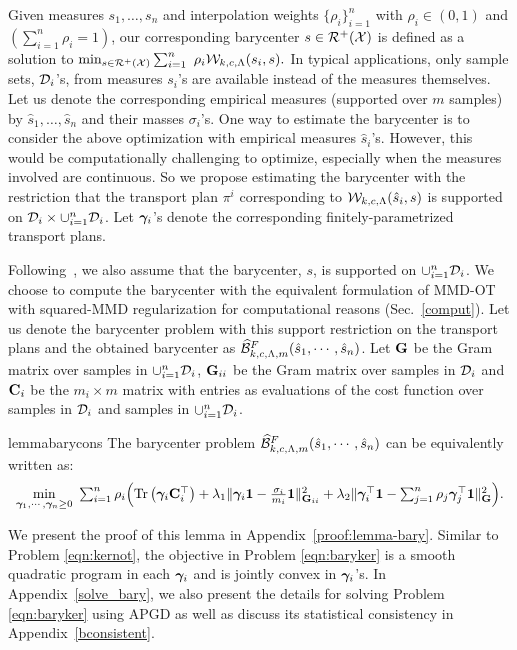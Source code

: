 Given measures $s_1,\ldots,s_n$ and interpolation weights $\{\rho_i\}_{i=1}^n$ with $\rho_i\in (0, 1)$ and $(\sum_{i=1}^n \rho_i = 1)$, our corresponding barycenter $s\in\mathcal{R}^+(\mathcal{X})$ is defined as a solution to $\min_{s\in\calR^+(\calX)}\sum_{i=1}^n\ \rho_i \calU(s_i,s).$
In typical applications, only sample sets, $\mathcal{D}_i$'s, from measures $s_i$'s are available instead of the measures themselves. Let us denote the corresponding empirical measures (supported over $m$ samples) by $\hat{s}_1,\ldots,\hat{s}_n$ and their masses $\sigma_i$'s. One way to estimate the barycenter is to consider the above optimization with empirical measures $\hat{s}_i$'s. However, this would be computationally challenging to optimize, especially when the measures involved are continuous. So we propose estimating the barycenter with the restriction that the transport plan $\pi^i$ corresponding to $\mathcal{W}_{k, c, \Lambda}(\hat{s}_i, s)$ is supported on $\mathcal{D}_i\times \cup_{i=1}^n\mathcal{D}_i$. Let $\bm{\gamma}_i$'s denote the corresponding finitely-parametrized transport plans. 

Following~\cite{10.5555/3044805.3044969}, we also assume that the barycenter, $s$, is supported on $\cup_{i=1}^n\mathcal{D}_i$. We choose to compute the barycenter with the equivalent formulation of MMD-OT with squared-MMD regularization for computational reasons (Sec.~\ref{comput}). Let us denote the barycenter problem with this support restriction on the transport plans and the obtained barycenter as $\widehat{\mathcal{B}}^F_{k,c,\Lambda, m}(\hat{s}_1, \cdots, \hat{s}_n)$.
Let $\mathbf{G}$ be the Gram matrix over samples in $\cup_{i=1}^n\mathcal{D}_i$, $\mathbf{G}_{ii}$ be the Gram matrix over samples in $\mathcal{D}_i$ and $\mathbf{C}_i$ be the $m_i\times m$ matrix with entries as evaluations of the cost function over samples in $\mathcal{D}_i$ and samples in $\cup_{i=1}^n\mathcal{D}_i$. 

\begin{lemmaBox}
    \begin{restatable}{lemma}{barycons}\label{lemma:bary}
The barycenter problem $\widehat{\mathcal{B}}^F_{k,c,\Lambda, m}(\hat{s}_1, \cdots, \hat{s}_n)$ can be equivalently written as:
\begin{equation}\label{eqn:baryker}
\begin{array}{c}
\min\limits_{\bm{\gamma}_1,\cdots, \bm{\gamma}_n\ge0}\ \sum_{i=1}^n \rho_i\Big(\textup{Tr}\left(\bm{\gamma}_i\mathbf{C}_i^\top\right)+\lambda_1\|\bm{\gamma}_i\mathbf{1}-\frac{\sigma_i}{m_i}\mathbf{1}\|^2_{\mathbf{G}_{ii}}+\lambda_2\|\bm{\gamma}_i^\top\mathbf{1}-\sum_{j=1}^n\rho_j\bm{\gamma}_j^\top\mathbf{1}\|^2_{\mathbf{G}}\Big). 
\end{array}
\end{equation}
\end{restatable}
\end{lemmaBox}
We present the proof of this lemma in Appendix~\ref{proof:lemma-bary}. 
Similar to Problem \ref{eqn:kernot}, the objective in Problem \ref{eqn:baryker} is a smooth quadratic program in each $\bm{\gamma}_i$ and is jointly convex in $\bm{\gamma}_i$'s. In Appendix~\ref{solve_bary}, we also present the details for solving Problem \ref{eqn:baryker} using APGD as well as discuss its statistical consistency in Appendix~\ref{bconsistent}. 
